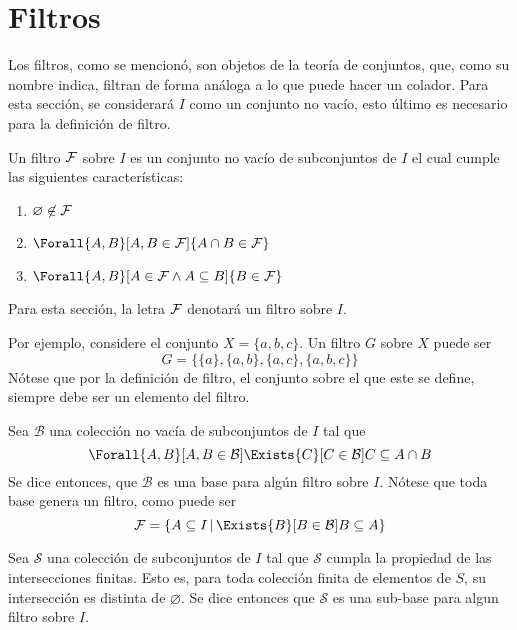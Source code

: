 \section{Filtros}

Los filtros, como se mencionó, son objetos de la teoría de conjuntos,
que, como su nombre indica, filtran de forma análoga a lo que
puede hacer un colador. Para esta sección, se considerará $I$ como un
conjunto no vacío, esto último es necesario para la definición de filtro.

\begin{definition}\label{def:filtro}
  Un filtro $\mathcal{F}$ sobre $I$ es un conjunto no vacío de subconjuntos de $I$
  el cual cumple las siguientes características:
  \begin{enumerate}
    \item $\varnothing \not\in \mathcal{F}$
    \item $\Forall{A,B}[A,B \in \F]{A\cap B \in \F}$
    \item $\Forall{A,B}[A\in \F \land A \subseteq B]{B \in \F}$
  \end{enumerate}

  Para esta sección, la letra $\mathcal{F}$ denotará un filtro sobre $I$.
\end{definition}

Por ejemplo, considere el conjunto $X=\{a,b,c\}$. Un filtro $G$ sobre $X$
puede ser 
\[G = \{\{a\}, \{a,b\}, \{a,c\}, \{a,b,c\}\}\]
Nótese que por la definición de filtro, el conjunto sobre el que este se
define, siempre debe ser un elemento del filtro.

\begin{definition}
  Sea $\mathcal{B}$ una colección no vacía de subconjuntos de $I$ tal
  que
  \[
    \Forall{A,B}[A,B \in \mathcal{B}]{
      \Exists{C}[C\in\mathcal{B}]{C \subseteq A \cap B}
      }
  \]
  Se dice entonces, que $\mathcal{B}$ es una base para algún filtro sobre $I$.
  Nótese que toda base genera un filtro, como puede ser
  \[\F = \{A \subseteq I \,|\, \Exists{B}[B\in\mathcal{B}]{B\subseteq A}\}\]
\end{definition}

\begin{definition}
  Sea $\mathcal{S}$ una colección de subconjuntos de $I$ tal que
  $\mathcal{S}$ cumpla la propiedad de las intersecciones finitas. Esto es,
  para toda colección finita de elementos de $S$, su intersección es
  distinta de $\varnothing$. Se dice entonces que $\mathcal{S}$ es una
  sub-base para algun filtro sobre $I$.
\end{definition}

